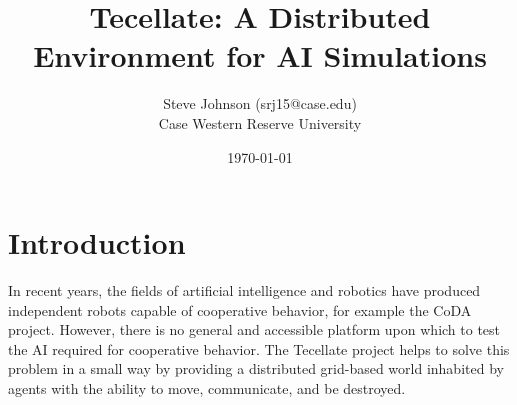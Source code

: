 \documentclass[12pt]{article}
\title{Tecellate: A Distributed Environment for AI Simulations}
\author{
        Steve Johnson (srj15@case.edu)\\
        Case Western Reserve University\\
}
\date{\today}
\begin{document}
\doublespacing
\maketitle


\section{Introduction}

In recent years, the fields of artificial intelligence and robotics have produced independent robots capable of cooperative behavior, for example the CoDA project\cite{CoDA}. However, there is no general and accessible platform upon which to test the AI required for cooperative behavior. The Tecellate project helps to solve this problem in a small way by providing a distributed grid-based world inhabited by agents with the ability to move, communicate, and be destroyed.











\end{document}
